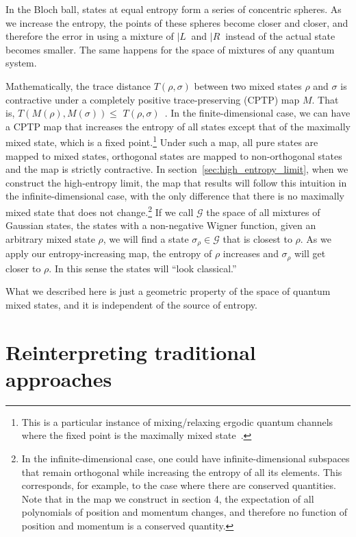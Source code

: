 \documentclass{SciPost}
\begin{document}
In the Bloch ball, states at equal entropy form a series of concentric spheres. As we increase the entropy, the points of these spheres become closer and closer, and therefore the error in using a mixture of $|L\>$ and $|R\>$ instead of the actual state becomes smaller. The same happens for the space of mixtures of any quantum system.

Mathematically, the trace distance $T(\rho,\sigma)$ between two mixed states $\rho$ and $\sigma$ is contractive under a completely positive trace-preserving (CPTP) map $M$. That is, $T(M(\rho),M(\sigma)) \leq$ $T(\rho,\sigma)$~\cite{nielsen2010quantum}. In the finite-dimensional case, we can have a CPTP map that increases the entropy of all states except that of the maximally mixed state, which is a fixed point.\footnote{This is a particular instance of mixing/relaxing ergodic quantum channels where the fixed point is the maximally mixed state~\cite{Burgarth2012ErgodicAM}.}  Under such a map, all pure states are mapped to mixed states, orthogonal states are mapped to non-orthogonal states and the map is strictly contractive. In section~\ref{sec:high_entropy_limit}, when we construct the high-entropy limit, the map that results will follow this intuition in the infinite-dimensional case, with the only difference that there is no maximally mixed state that does not change.\footnote{In the infinite-dimensional case, one could have infinite-dimensional subspaces that remain orthogonal while increasing the entropy of all its elements. This corresponds, for example, to the case where there are conserved quantities. Note that in the map we construct in section 4, the expectation of all polynomials of position and momentum changes, and therefore no function of position and momentum is a conserved quantity. }  If we call $\mathcal{G}$ the space of all mixtures of Gaussian states, the states with a non-negative Wigner function, given an arbitrary mixed state $\rho$, we will find a state $\sigma_{\rho} \in \mathcal{G}$ that is closest to $\rho$. As we apply our entropy-increasing map, the entropy of $\rho$ increases and $\sigma_{\rho}$ will get closer to $\rho$. In this sense the states will ``look classical.''

What we described here is just a geometric property of the space of quantum mixed states, and it is independent of the source of entropy.

\section{Reinterpreting traditional approaches}
\end{document}
